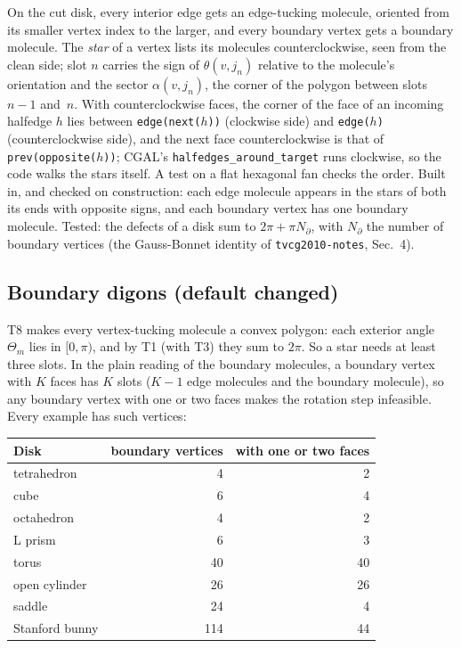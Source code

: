 \documentclass[11pt]{article}
\theoremstyle{definition}
\begin{document}
On the cut disk, every interior edge gets an edge-tucking molecule, oriented
from its smaller vertex index to the larger, and every boundary vertex gets a
boundary molecule. The \emph{star} of a vertex lists its molecules
counterclockwise, seen from the clean side; slot $n$ carries the sign of
$\theta(v, j_n)$ relative to the molecule's orientation and the sector
$\alpha(v, j_n)$, the corner of the polygon between slots $n-1$ and~$n$. With
counterclockwise faces, the corner of the face of an incoming halfedge $h$
lies between \texttt{edge(next($h$))} (clockwise side) and
\texttt{edge($h$)} (counterclockwise side), and the next face counterclockwise
is that of \texttt{prev(opposite($h$))}; CGAL's
\texttt{halfedges\_around\_target} runs clockwise, so the code walks the stars
itself. A test on a flat hexagonal fan checks the order. Built in, and checked
on construction: each edge molecule appears in the stars of both its ends with
opposite signs, and each boundary vertex has one boundary molecule. Tested:
the defects of a disk sum to $2\pi + \pi N_\partial$, with $N_\partial$ the
number of boundary vertices (the Gauss-Bonnet identity of
\texttt{tvcg2010-notes}, Sec.~4).

\subsection{Boundary digons (default changed)}

T8 makes every vertex-tucking molecule a convex polygon: each exterior angle
$\Theta_m$ lies in $[0, \pi)$, and by T1 (with T3) they sum to $2\pi$. So a star
needs at least three slots. In the plain reading of the boundary molecules, a
boundary vertex with $K$ faces has $K$ slots ($K-1$ edge molecules and the
boundary molecule), so any boundary vertex with one or two faces makes the
rotation step infeasible. Every example has such vertices:

\begin{center}
\small
\begin{tabular}{@{}lrr@{}}
\toprule
Disk & boundary vertices & with one or two faces \\
\midrule
tetrahedron & 4 & 2 \\
cube & 6 & 4 \\
octahedron & 4 & 2 \\
L prism & 6 & 3 \\
torus & 40 & 40 \\
open cylinder & 26 & 26 \\
saddle & 24 & 4 \\
Stanford bunny & 114 & 44 \\
\bottomrule
\end{tabular}
\end{center}
\end{document}
